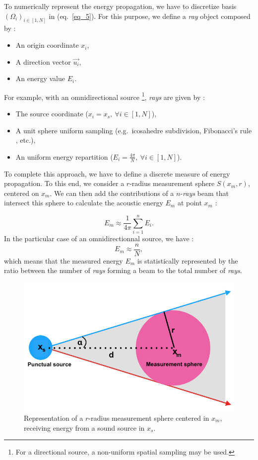 \documentclass[AMA,STIX1COL]{WileyNJD-v2}
\begin{document}
To numerically represent the energy propagation, we have to discretize basis $(\Omega_i)_{i\in[1,N] }$ in (eq.~\ref{eq_5}). For this purpose, we define a \textit{ray} object composed by :
\begin{itemize}
\item An origin coordinate $x_i$,
\item A direction vector $\overrightarrow{u_i}$,
\item An energy value $E_i$.
\end{itemize}

For example, with an omnidirectional source \footnote{For a directional source, a non-uniform spatial sampling may be used.}, \textit{rays} are given by :
\begin{itemize}
\item The source coordinate ($x_i = x_s,~\forall i\in[1,N]$),
\item A unit sphere uniform sampling (e.g.~icosahedre subdivision, Fibonacci's rule \cite{fibonacci}, etc.),
\item An uniform energy repartition ($E_i = \frac{4\pi}{N},~\forall i\in[1,N]$).
\end{itemize}

To complete this approach, we have to define a discrete measure of energy propagation. To this end, we consider a $r$-radius measurement sphere $S(x_m, r)$, centered on $x_m$.  We can then add the contributions of a $n$-\textit{rays}  beam that intersect this sphere to calculate the acoustic energy $E_m$ at point $x_m$ :

\begin{equation}
E_m \approx  \frac{1}{4\pi}  \sum_{i=1}^n E_i.
\end{equation}
In the particular case of an omnidirectionnal source, we have : 
\begin{equation}
E_m \approx  \frac{n}{N},
\label{eq_7}
\end{equation}
which means that the measured energy $E_m$ is statistically represented by the ratio between the number of \textit{rays} forming a beam to the total number of \textit{rays}.

\begin{figure}[t]
\centering
	\includegraphics[width=0.6\linewidth]{schema_rayon}
	\caption{Representation of a $r$-radius measurement sphere centered in $x_m$, receiving energy from a sound source in $x_s$.}
	\label{schema_rayon}
\end{figure}
\end{document}
